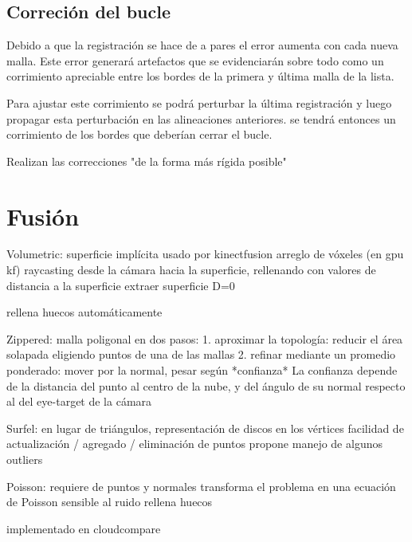 \documentclass{pfc}
\begin{document}
		\subsection{Correción del bucle}
			Debido a que la registración se hace de a pares el error aumenta
			con cada nueva malla.
			Este error generará artefactos que se evidenciarán sobre todo como
			un corrimiento apreciable entre los bordes de la primera y última
			malla de la lista.

			Para ajustar este corrimiento se podrá perturbar la última
			registración y luego propagar esta perturbación en las alineaciones
			anteriores.
			se tendrá entonces un corrimiento de los
			bordes que deberían cerrar el bucle.

			Realizan las correcciones "de la forma más rígida posible"

	\section{Fusión}
		Volumetric: superficie implícita %
			usado por kinectfusion
			arreglo de vóxeles (en gpu kf)
			raycasting desde la cámara hacia la superficie,
				rellenando con valores de distancia a la superficie
			extraer superficie D=0

			rellena huecos automáticamente

		Zippered: %
			malla poligonal
			en dos pasos:
				1. aproximar la topología: reducir el área solapada eligiendo puntos de una de las mallas
				2. refinar mediante un promedio ponderado: mover por la normal, pesar según *confianza*
			La confianza depende de la distancia del punto al centro de la nube, y del ángulo de su normal respecto al del eye-target de la cámara

		Surfel: %
			en lugar de triángulos, representación de discos en los vértices
			facilidad de actualización / agregado / eliminación de puntos
			propone manejo de algunos outliers

		Poisson: %
			requiere de puntos y normales
			transforma el problema en una ecuación de Poisson %
			sensible al ruido
			rellena huecos

			implementado en cloudcompare
\end{document}
